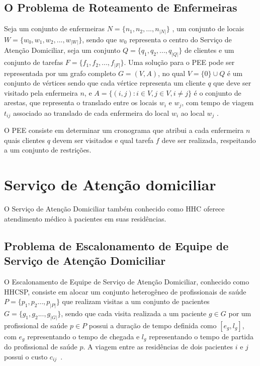 \subsection{O Problema de Roteamento de Enfermeiras}

Seja um conjunto de enfermeiras $N = \{n_1, n_2, ..., n_{|N|}\}$ , um conjunto de locais $W = \{w_0, w_1, w_2, ..., w_{|W|}\}$, sendo que $w_0$ representa o centro do Serviço de Atenção Domiciliar, seja um conjunto $Q = \{q_1, q_2, ..., q_{|Q|}\}$ de clientes e um conjunto de tarefas $F = \{ f_1, f_2, ..., f_{|F|}\}$.  
Uma solução para o \ac{PEE} pode ser representada por um grafo completo $G = (V, A)$, no qual $V = \{0\} \cup Q$ é um conjunto de vértices sendo que cada vértice representa um cliente $q$ que deve ser visitado pela enfermeira $n$, e $A = \{ (i,j): i \in V, j \in V, i \neq j \}$ é o conjunto de arestas, que representa o translado entre os locais $w_i$ e $w_j$, com tempo de viagem $t_{ij}$ associado ao translado de cada enfermeira do local $w_i$ ao local $w_j$ \cite{mansini:2016}.

O \ac{PEE} consiste em determinar um cronograma que atribui a cada enfermeira $n$ quais clientes $q$ devem ser visitados e qual tarefa $f$ deve ser realizada, respeitando a um conjunto de restrições\cite{mansini:2016}.

\section{Serviço de Atenção domiciliar}

O Serviço de Atenção Domiciliar também conhecido como \ac{HHC} oferece atendimento médico à pacientes em suas residências. 

\subsection{Problema de Escalonamento de Equipe de Serviço de Atenção Domiciliar}

O Escalonamento de Equipe de Serviço de Atenção Domiciliar, conhecido como \ac{HHCSP}, consiste em alocar um conjunto heterogêneo de profissionais de saúde $P = \{ p_1, p_2 ..., p_{|P|} \}$  que realizam visitas a um conjunto de pacientes  $G = \{ g_1, g_2 ..., g_{|G|} \}$, sendo que cada visita realizada a um paciente $g \in G$ por um profissional de saúde $p \in P$ possui a duração de tempo definida como $[e_{g}, l_{g}]$, com $e_{g}$ representando o tempo de chegada e $l_{g}$ representando o tempo de partida do profissional de saúde $p$. A viagem entre as residências de dois pacientes $i$ e $j$  possui o custo $c_{ij}$~\cite{rasmussenm:2012}.   

